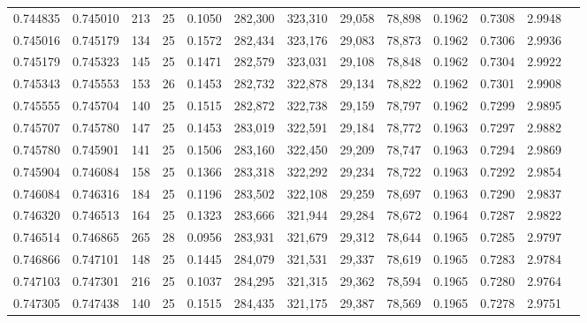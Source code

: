 \begin{tabular}{rrrrrrrrrrrrr}
0.744835 & 0.745010 &   213 &  25 &                                     0.1050 & 282,300 & 323,310 &  29,058 &  78,898 & 0.1962 & 0.7308 & 2.9948 \\
0.745016 & 0.745179 &   134 &  25 &                                     0.1572 & 282,434 & 323,176 &  29,083 &  78,873 & 0.1962 & 0.7306 & 2.9936 \\
0.745179 & 0.745323 &   145 &  25 &                                     0.1471 & 282,579 & 323,031 &  29,108 &  78,848 & 0.1962 & 0.7304 & 2.9922 \\
0.745343 & 0.745553 &   153 &  26 &                                     0.1453 & 282,732 & 322,878 &  29,134 &  78,822 & 0.1962 & 0.7301 & 2.9908 \\
0.745555 & 0.745704 &   140 &  25 &                                     0.1515 & 282,872 & 322,738 &  29,159 &  78,797 & 0.1962 & 0.7299 & 2.9895 \\
0.745707 & 0.745780 &   147 &  25 &                                     0.1453 & 283,019 & 322,591 &  29,184 &  78,772 & 0.1963 & 0.7297 & 2.9882 \\
0.745780 & 0.745901 &   141 &  25 &                                     0.1506 & 283,160 & 322,450 &  29,209 &  78,747 & 0.1963 & 0.7294 & 2.9869 \\
0.745904 & 0.746084 &   158 &  25 &                                     0.1366 & 283,318 & 322,292 &  29,234 &  78,722 & 0.1963 & 0.7292 & 2.9854 \\
0.746084 & 0.746316 &   184 &  25 &                                     0.1196 & 283,502 & 322,108 &  29,259 &  78,697 & 0.1963 & 0.7290 & 2.9837 \\
0.746320 & 0.746513 &   164 &  25 &                                     0.1323 & 283,666 & 321,944 &  29,284 &  78,672 & 0.1964 & 0.7287 & 2.9822 \\
0.746514 & 0.746865 &   265 &  28 &                                     0.0956 & 283,931 & 321,679 &  29,312 &  78,644 & 0.1965 & 0.7285 & 2.9797 \\
0.746866 & 0.747101 &   148 &  25 &                                     0.1445 & 284,079 & 321,531 &  29,337 &  78,619 & 0.1965 & 0.7283 & 2.9784 \\
0.747103 & 0.747301 &   216 &  25 &                                     0.1037 & 284,295 & 321,315 &  29,362 &  78,594 & 0.1965 & 0.7280 & 2.9764 \\
0.747305 & 0.747438 &   140 &  25 &                                     0.1515 & 284,435 & 321,175 &  29,387 &  78,569 & 0.1965 & 0.7278 & 2.9751 \\

\end{tabular}
